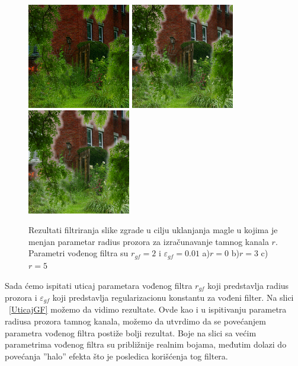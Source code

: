 \documentclass[a4paper,12pt,titlepage]{article}
\begin{document}
\begin{figure}[ht!]
\centering
\includegraphics[width=45mm]{img/hazeResDC0.png}
\includegraphics[width=45mm]{img/hazeResDC3.png}
\includegraphics[width=45mm]{img/hazeResDC5.png}
\caption{Rezultati filtriranja slike zgrade u cilju uklanjanja magle u kojima je menjan parametar radius prozora za izračunavanje tamnog kanala $r$. Parametri vođenog filtra su $r_{gf} = 2$ i  $\varepsilon_{gf} = 0.01$ a)$r = 0$ b)$r = 3$ c)$r = 5$}
\label{UticajRdc}
\end{figure}  

Sada ćemo ispitati uticaj parametara vođenog filtra $r_{gf}$ koji predstavlja radius prozora i $\varepsilon_{gf}$ koji predstavlja  regularizacionu konstantu za vođeni filter. Na slici ~\ref{UticajGF} možemo da vidimo rezultate. Ovde kao i u ispitivanju parametra radiusa prozora tamnog kanala, možemo da utvrdimo da se povećanjem parametra vođenog filtra postiže bolji rezultat. Boje na slici sa većim parametrima vođenog filtra su približnije realnim bojama, međutim dolazi do povećanja ''halo'' efekta što je posledica korišćenja tog filtera. 
\end{document}
